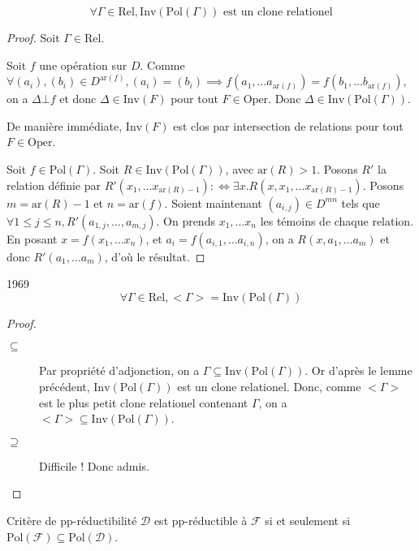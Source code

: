 \documentclass[12pt]{article}
\newcommand\Rel{\text{Rel}}
\newcommand\Oper{\text{Oper}}
\newcommand\Inv{\text{Inv}}
\newcommand\Pol{\text{Pol}}
\newcommand\ar{\text{ar}}
\begin{document}
\begin{lem}{}
    \[\forall \Gamma\in\Rel, \Inv(\Pol(\Gamma)) \text{ est un clone relationel}\]
\end{lem}
\begin{proof}
    Soit $\Gamma\in\Rel$.

    Soit $f$ une opération sur $D$. Comme
    $\forall (a_i), (b_i)\in D^{\ar(f)}, (a_i) = (b_i) 
        \implies f(a_1, \dots a_{\ar(f)}) = f(b_1, \dots b_{\ar(f)})$, on a $\Delta\bot f$
    et donc $\Delta\in \Inv(F)$ pour tout $F\in\Oper$. Donc $\Delta\in\Inv(\Pol(\Gamma))$.

    De manière immédiate, $\Inv(F)$ est clos par intersection de relations pour tout
    $F\in\Oper$.

    Soit $f\in\Pol(\Gamma)$. Soit $R\in\Inv(\Pol(\Gamma))$, avec $\ar(R)>1$. Posons
    $R'$ la relation définie par $R'(x_1, \dots x_{\ar(R)-1}) :\iff
    \exists x. R(x, x_1, \dots x_{\ar(R)-1})$. Posons $m = \ar(R) - 1$ et $n = \ar(f)$.
    Soient maintenant $(a_{i,j})\in D^{mn}$ tels que
    $\forall 1\leq j\leq n, R'(a_{1,j}, \dots, a_{m,j})$. On prends $x_1, \dots x_n$ les
    témoins de chaque relation. En posant $x = f(x_1, \dots x_n)$, et
    $a_i = f(a_{i,1}, \dots a_{i,n})$, on a $R(x, a_1, \dots a_m)$ et donc
    $R'(a_1, \dots a_m)$, d'où le résultat.
\end{proof}

\begin{theo}{1969}
    \[\forall \Gamma\in\Rel, <\Gamma> = \Inv(\Pol(\Gamma))\]
\end{theo}
\begin{proof}\begin{description}
    \item[$\subseteq$] Par propriété d'adjonction, on a 
        $\Gamma\subseteq\Inv(\Pol(\Gamma))$. Or d'après le lemme précédent, 
        $\Inv(\Pol(\Gamma))$ est un clone relationel. Donc, comme $<\Gamma >$ est le
        plus petit clone relationel contenant $\Gamma$, on a 
        $<\Gamma>\subseteq\Inv(\Pol(\Gamma))$.
    \item[$\supseteq$] Difficile ! Donc admis. %
\end{description}\end{proof}

\begin{cor}{Critère de pp-réductibilité}
    $\mathcal{D}$ est pp-réductible à $\mathcal{F}$ si et seulement si
    $\Pol(\mathcal{F})\subseteq\Pol(\mathcal{D})$.
\end{cor}
\end{document}

